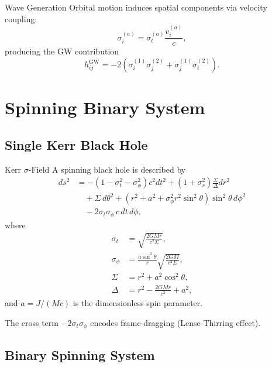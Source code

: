 \documentclass[11pt,a4paper]{article}
\theoremstyle{definition}
\theoremstyle{remark}
\begin{document}
	Wave Generation
		Orbital motion induces spatial components via velocity coupling:
		\begin{equation}
			\sigma_i^{(a)} = \sigma_t^{(a)} \frac{v_i^{(a)}}{c},
		\end{equation}
		producing the GW contribution
		\begin{equation}
			h_{ij}^{\text{GW}} = -2\left(\sigma_i^{(1)}\sigma_j^{(2)} + \sigma_j^{(1)}\sigma_i^{(2)}\right).
		\end{equation}
	
	\section{Spinning Binary System}
	
	\subsection{Single Kerr Black Hole}
	
	Kerr $\sigma$-Field
		A spinning black hole is described by
		\begin{equation}
			\boxed{
				\begin{aligned}
					ds^2 &= -(1 - \sigma_t^2 - \sigma_\phi^2) c^2 dt^2 + (1 + \sigma_r^2) \frac{\Sigma}{\Delta} dr^2\\
					&\quad + \Sigma \, d\theta^2 + \left(r^2 + a^2 + \sigma_\phi^2 r^2 \sin^2\theta\right) \sin^2\theta \, d\phi^2\\
					&\quad - 2\sigma_t \sigma_\phi \, c \, dt \, d\phi,
				\end{aligned}
			}
		\end{equation}
		where
		\begin{align}
			\sigma_t &= \sqrt{\frac{2GMr}{c^2\Sigma}},\\
			\sigma_\phi &= \frac{a\sin^2\theta}{r} \sqrt{\frac{2GM}{c^2\Sigma}},\\
			\Sigma &= r^2 + a^2\cos^2\theta,\\
			\Delta &= r^2 - \frac{2GMr}{c^2} + a^2,
		\end{align}
		and $a = J/(Mc)$ is the dimensionless spin parameter.
	
		The cross term $-2\sigma_t\sigma_\phi$ encodes frame-dragging (Lense-Thirring effect).
	
	\subsection{Binary Spinning System}
	
\end{document}
